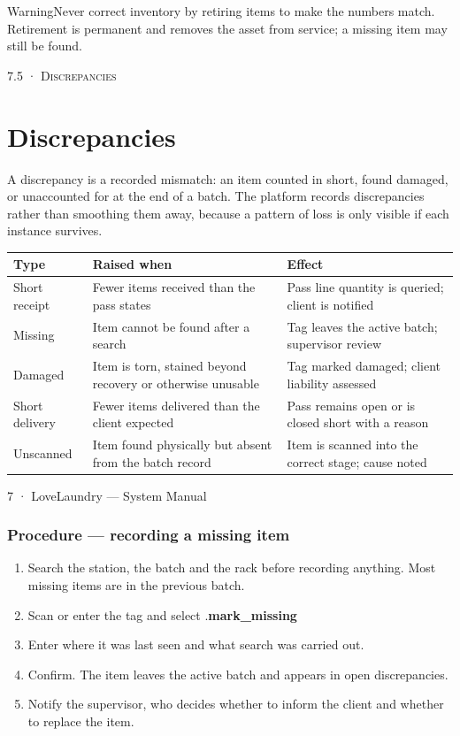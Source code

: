 \documentclass[11pt,a4paper,oneside]{book}
\begin{document}
\begin{notebox}WarningNever correct inventory by retiring items to make the numbers match. Retirement is permanent and removes the asset from service; a missing item may still be found.\end{notebox}
\textsc{\small\color{crimson}7.5 · Discrepancies}\par\medskip
\section*{Discrepancies}
A discrepancy is a recorded mismatch: an item counted in short, found damaged, or unaccounted for at the end of a batch. The platform records discrepancies rather than smoothing them away, because a pattern of loss is only visible if each instance survives.

\begin{center}\small
\begin{tabularx}{\linewidth}{|X|X|X|}
\hline
\rowcolor{lightgrey}
\textbf{Type} & \textbf{Raised when} & \textbf{Effect} \\ \hline
Short receipt & Fewer items received than the pass states & Pass line quantity is queried; client is notified \\ \hline
Missing & Item cannot be found after a search & Tag leaves the active batch; supervisor review \\ \hline
Damaged & Item is torn, stained beyond recovery or otherwise unusable & Tag marked damaged; client liability assessed \\ \hline
Short delivery & Fewer items delivered than the client expected & Pass remains open or is closed short with a reason \\ \hline
Unscanned & Item found physically but absent from the batch record & Item is scanned into the correct stage; cause noted \\ \hline
\end{tabularx}
\end{center}
7 · LoveLaundry — System Manual

\subsubsection*{Procedure — recording a missing item}
\begin{enumerate}
\item Search the station, the batch and the rack before recording anything. Most missing items are in the previous batch.
\item Scan or enter the tag and select .\textbf{mark\_missing}
\item Enter where it was last seen and what search was carried out.
\item Confirm. The item leaves the active batch and appears in open discrepancies.
\item Notify the supervisor, who decides whether to inform the client and whether to replace the item.
\end{enumerate}
\end{document}
